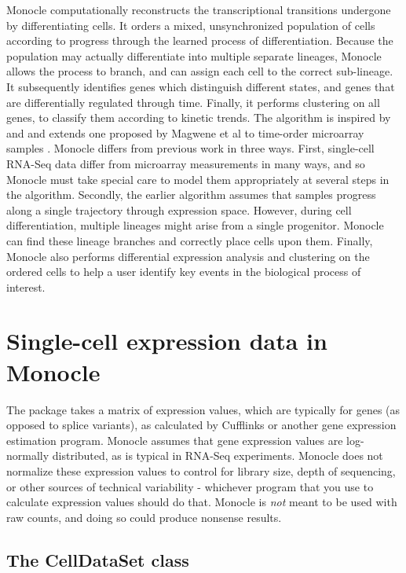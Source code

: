 \documentclass[10pt,oneside]{article}\usepackage[]{graphicx}\usepackage[]{color}
\begin{document}
Monocle computationally reconstructs the transcriptional transitions undergone by differentiating cells.  It orders a mixed, unsynchronized population of cells according to progress through the learned process of differentiation. Because the population may actually differentiate into multiple separate lineages, Monocle allows the process to branch, and can assign each cell to the correct sub-lineage. It subsequently identifies genes which distinguish different states, and genes that are differentially regulated through time. Finally, it performs clustering on all genes, to classify them according to kinetic trends. The algorithm is inspired by and and extends one proposed by Magwene et al to time-order microarray samples \cite{Magwene:2003kq}. Monocle differs from previous work in three ways. First, single-cell RNA-Seq data differ from microarray measurements in many ways, and so Monocle must take special care to model them appropriately at several steps in the algorithm. Secondly, the earlier algorithm assumes that samples progress along a single trajectory through expression space.  However, during cell differentiation, multiple lineages might arise from a single progenitor.  Monocle can find these lineage branches and correctly place cells upon them. Finally, Monocle also performs differential expression analysis and clustering on the ordered cells to help a user identify key events in the biological process of interest.

\section{Single-cell expression data in Monocle}

The  package takes a matrix of expression values, which are typically for genes (as opposed to splice variants), as calculated by Cufflinks\cite{Trapnell:2012kp} or another gene expression estimation program. Monocle assumes that gene expression values are log-normally distributed, as is typical in RNA-Seq experiments. Monocle does not normalize these expression values to control for library size, depth of sequencing, or other sources of technical variability - whichever program that you use to calculate expression values should do that.  Monocle is \emph{not} meant to be used with raw counts, and doing so could produce nonsense results.   

\subsection{The CellDataSet class}
\end{document}
